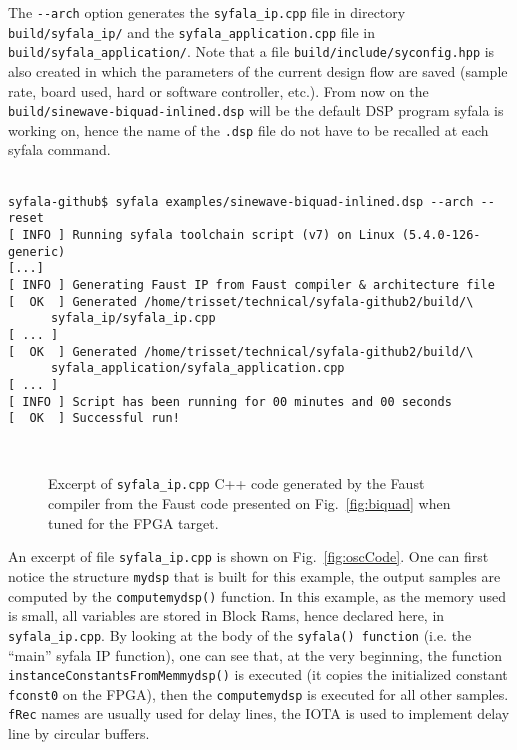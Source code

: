 The \verb#--arch# option generates the {\tt syfala\_ip.cpp} file in directory {\tt build/syfala\_ip/} and the {\tt syfala\_application.cpp} file in {\tt build/syfala\_application/}. Note that a file {\tt build/include/syconfig.hpp} is also created in which the parameters of the current design flow are saved (sample rate, board used, hard or software controller, etc.). From now on the {\tt build/sinewave-biquad-inlined.dsp} will be the default DSP program syfala is working on, hence the name of the {\tt .dsp} file do not have to be recalled at each syfala command.\\
~\\
\begin{boxedminipage}{1.03\textwidth}
  \small
\begin{verbatim}
syfala-github$ syfala examples/sinewave-biquad-inlined.dsp --arch --reset
[ INFO ] Running syfala toolchain script (v7) on Linux (5.4.0-126-generic)
[...]
[ INFO ] Generating Faust IP from Faust compiler & architecture file
[  OK  ] Generated /home/trisset/technical/syfala-github2/build/\
      syfala_ip/syfala_ip.cpp
[ ... ] 
[  OK  ] Generated /home/trisset/technical/syfala-github2/build/\
      syfala_application/syfala_application.cpp
[ ... ] 
[ INFO ] Script has been running for 00 minutes and 00 seconds
[  OK  ] Successful run!
\end{verbatim}
\end{boxedminipage}
~\\

\begin{figure}[ht] 
 \begin{boxedminipage}{\columnwidth}
    \tiny
    
  \end{boxedminipage}
  \caption{Excerpt of {\tt syfala\_ip.cpp} C++ code generated by the Faust compiler from the Faust code presented on Fig.~\ref{fig:biquad} when tuned for the FPGA target.}
  \label{fig:oscCode}
  \label{fig:biquadCode}
\end{figure}

An excerpt of file {\tt syfala\_ip.cpp} is shown on Fig.~\ref{fig:oscCode}. One can first notice the structure {\tt mydsp} that is built for this example, the output  samples are computed by the {\tt computemydsp()} function. In this example, as the memory used is small, all variables are stored in Block Rams, hence declared here, in {\tt syfala\_ip.cpp}. By looking at the body of the {\tt syfala() function} (i.e. the ``main'' syfala IP function),  one can see that, at the very beginning,  the function {\tt instanceConstantsFromMemmydsp()} is executed (it copies the initialized constant {\tt fconst0} on the FPGA), then the {\tt computemydsp} is executed for all other samples. {\tt fRec} names are usually used for delay lines, the IOTA is used to implement delay line by circular buffers.

